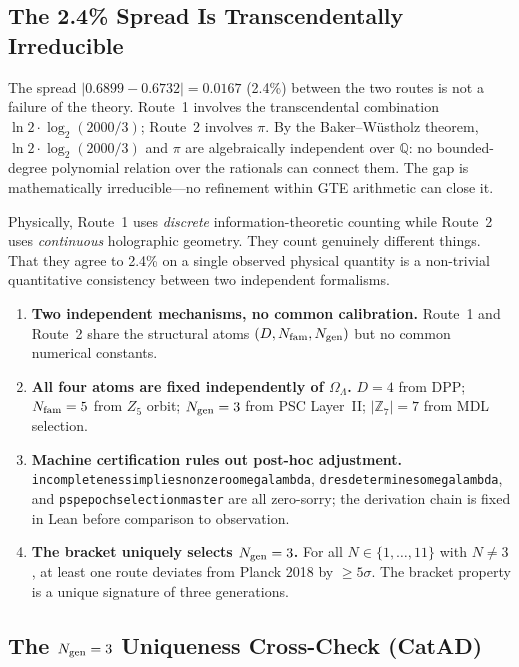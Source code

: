 \documentclass[11pt,openany]{book}
\theoremstyle{remark}
\newcommand{\ZS}{\mathbb{Z}_7}
\newcommand{\lean}[1]{%
  \penalty-100
  \begingroup\def\_{\textunderscore\allowbreak}\texttt{#1}\endgroup}
\newcommand{\OmL}{\Omega_\Lambda}
\begin{document}
\subsection*{The 2.4\% Spread Is Transcendentally Irreducible}

The spread $|0.6899 - 0.6732| = 0.0167$ (2.4\%) between the two routes is not a failure
of the theory.
Route~1 involves the transcendental combination $\ln 2 \cdot \log_2(2000/3)$;
Route~2 involves $\pi$.
By the Baker--W\"{u}stholz theorem, $\ln 2 \cdot \log_2(2000/3)$ and $\pi$ are
algebraically independent over $\mathbb{Q}$: no bounded-degree polynomial relation
over the rationals can connect them.
The gap is mathematically irreducible---no refinement within GTE arithmetic can close it.

Physically, Route~1 uses \emph{discrete} information-theoretic counting while Route~2
uses \emph{continuous} holographic geometry.
They count genuinely different things.
That they agree to 2.4\% on a single observed physical quantity is a non-trivial
quantitative consistency between two independent formalisms.

\begin{tcolorbox}[colback=yellow!8,colframe=yellow!60!black,
  title={Why This Is Not Numerology}]
\begin{enumerate}
\item \textbf{Two independent mechanisms, no common calibration.}
  Route~1 and Route~2 share the structural atoms
  $(D, N_{\rm fam}, N_{\rm gen})$ but no common numerical constants.
\item \textbf{All four atoms are fixed independently of $\OmL$.}
  $D=4$ from DPP; $N_{\rm fam}=5$ from $Z_5$ orbit; $N_{\rm gen}=3$ from PSC Layer~II;
  $|\ZS|=7$ from MDL selection.
\item \textbf{Machine certification rules out post-hoc adjustment.}
  \lean{incompleteness\_implies\_nonzero\_omega\_lambda},
  \lean{d\_res\_determines\_omega\_lambda},
  and \lean{psp\_epoch\_selection\_master} are all zero-sorry;
  the derivation chain is fixed in Lean before comparison to observation.
\item \textbf{The bracket uniquely selects $N_{\rm gen} = 3$.}
  For all $N \in \{1,\ldots,11\}$ with $N \neq 3$,
  at least one route deviates from Planck 2018 by $\geq 5\sigma$.
  The bracket property is a unique signature of three generations.
\end{enumerate}
\end{tcolorbox}

\subsection*{The \texorpdfstring{$N_{\rm gen} = 3$}{N=3} Uniqueness Cross-Check (CatAD)}
\end{document}
